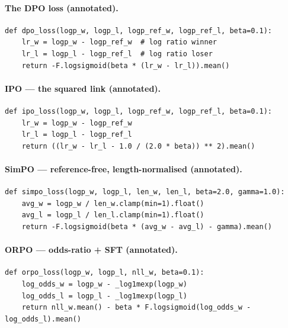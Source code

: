 \documentclass[11pt,oneside]{scrbook}
\begin{document}
\paragraph{The DPO loss (annotated).}
\begin{codebox}
\begin{verbatim}
def dpo_loss(logp_w, logp_l, logp_ref_w, logp_ref_l, beta=0.1):
    lr_w = logp_w - logp_ref_w  # log ratio winner
    lr_l = logp_l - logp_ref_l  # log ratio loser
    return -F.logsigmoid(beta * (lr_w - lr_l)).mean()
\end{verbatim}
\end{codebox}

\paragraph{IPO --- the squared link (annotated).}
\begin{codebox}
\begin{verbatim}
def ipo_loss(logp_w, logp_l, logp_ref_w, logp_ref_l, beta=0.1):
    lr_w = logp_w - logp_ref_w
    lr_l = logp_l - logp_ref_l
    return ((lr_w - lr_l - 1.0 / (2.0 * beta)) ** 2).mean()
\end{verbatim}
\end{codebox}

\paragraph{SimPO --- reference-free, length-normalised (annotated).}
\begin{codebox}
\begin{verbatim}
def simpo_loss(logp_w, logp_l, len_w, len_l, beta=2.0, gamma=1.0):
    avg_w = logp_w / len_w.clamp(min=1).float()
    avg_l = logp_l / len_l.clamp(min=1).float()
    return -F.logsigmoid(beta * (avg_w - avg_l) - gamma).mean()
\end{verbatim}
\end{codebox}

\paragraph{ORPO --- odds-ratio + SFT (annotated).}
\begin{codebox}
\begin{verbatim}
def orpo_loss(logp_w, logp_l, nll_w, beta=0.1):
    log_odds_w = logp_w - _log1mexp(logp_w)
    log_odds_l = logp_l - _log1mexp(logp_l)
    return nll_w.mean() - beta * F.logsigmoid(log_odds_w - log_odds_l).mean()
\end{verbatim}
\end{codebox}
\end{document}
